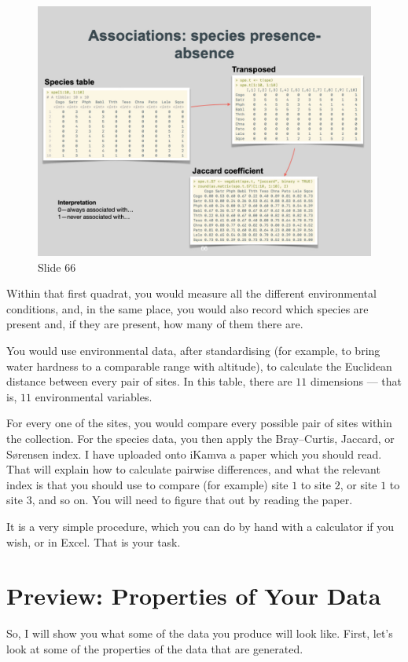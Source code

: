 \documentclass[
  12pt,
]{book}
\begin{document}
\begin{figure}[ht]
\centering
\includegraphics[width=0.8\linewidth]{../images/BDC334/BDC334-066.jpeg}
\caption*{Slide 66}
\end{figure}

Within that first quadrat, you would measure all the different
environmental conditions, and, in the same place, you would also record
which species are present and, if they are present, how many of them
there are.

You would use environmental data, after standardising (for example, to
bring water hardness to a comparable range with altitude), to calculate
the Euclidean distance between every pair of sites. In this table, there
are \(11\) dimensions --- that is, \(11\) environmental variables.

For every one of the sites, you would compare every possible pair of
sites within the collection. For the species data, you then apply the
Bray--Curtis, Jaccard, or Sørensen index. I have uploaded onto iKamva a
paper which you should read. That will explain how to calculate pairwise
differences, and what the relevant index is that you should use to
compare (for example) site \(1\) to site \(2\), or site \(1\) to site
\(3\), and so on. You will need to figure that out by reading the paper.

It is a very simple procedure, which you can do by hand with a
calculator if you wish, or in Excel. That is your task.

\section{Preview: Properties of Your
Data}\label{preview-properties-of-your-data}

So, I will show you what some of the data you produce will look like.
First, let's look at some of the properties of the data that are
generated.
\end{document}
